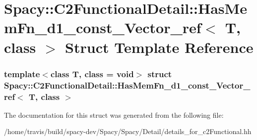 \hypertarget{structSpacy_1_1C2FunctionalDetail_1_1HasMemFn__d1__const__Vector__ref}{\section{\-Spacy\-:\-:\-C2\-Functional\-Detail\-:\-:\-Has\-Mem\-Fn\-\_\-d1\-\_\-const\-\_\-\-Vector\-\_\-ref$<$ \-T, class $>$ \-Struct \-Template \-Reference}
\label{structSpacy_1_1C2FunctionalDetail_1_1HasMemFn__d1__const__Vector__ref}
}
\subsubsection*{template$<$class T, class = void$>$ struct Spacy\-::\-C2\-Functional\-Detail\-::\-Has\-Mem\-Fn\-\_\-d1\-\_\-const\-\_\-\-Vector\-\_\-ref$<$ T, class $>$}



\-The documentation for this struct was generated from the following file\-:\begin{DoxyCompactItemize}
\item 
/home/travis/build/spacy-\/dev/\-Spacy/\-Spacy/\-Detail/details\-\_\-for\-\_\-c2\-Functional.\-hh\end{DoxyCompactItemize}
